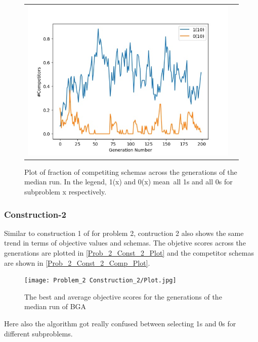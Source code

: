 \documentclass{article}
\begin{document}
\begin{figure}[H]
\begin{adjustbox}{width=0.6\paperwidth}
\begin{tabular}{c c}
			\includegraphics{Codes/Problem_2 Construction_1/Comp_10.jpg}\\
		\end{tabular}
	\end{adjustbox}
	\caption{Plot of fraction of competiting schemas across the generations of the median run. In the legend, 1(x) and 0(x) mean\ all 1s and all 0s for subproblem x respectively.}
	\label{Prob_2_Const_1_Comp_Plot}
\end{figure}

\subsubsection{Construction-2}

Similar to construction 1 of for problem 2, contruction 2 also shows the same trend in terms of objective values and schemas. The objetive scores across the generations are plotted in  \autoref{Prob_2_Const_2_Plot} and the competitor schemas are shown in \autoref{Prob_2_Const_2_Comp_Plot}. 

\begin{figure}[H]
	\centering
	\texttt{[image: Problem\_2 Construction\_2/Plot.jpg]}
	\caption{The best and average objective scores for the generations of the median run of BGA}
	\label{Prob_2_Const_2_Plot}
\end{figure}    

Here also the algorithm got really confused between selecting 1s and 0s for different subproblems.
	
\end{document}
